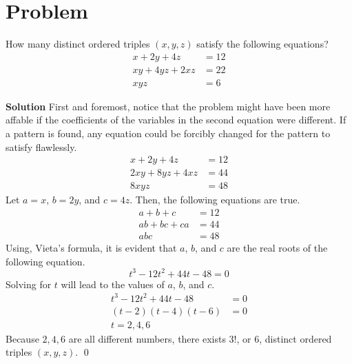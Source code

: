 \documentclass{article}
\newenvironment{solution}{\begin{trivlist}\item[]{\bf Solution}}{\qed \end{trivlist}}
\begin{document}
\section*{Problem}
How many distinct ordered triples $(x, y, z)$ satisfy the following equations?
\begin{align*}
    x + 2y + 4z &= 12 \\
    xy + 4yz + 2xz &= 22 \\
    xyz &= 6
\end{align*}
\begin{solution}
First and foremost, notice that the problem might have been more affable if the coefficients of the variables in the second equation were different. If a pattern is found, any equation could be forcibly changed for the pattern to satisfy flawlessly.
\begin{align*}
    x + 2y + 4z &= 12 \\
    2xy + 8yz + 4xz &= 44 \\
    8xyz &= 48
\end{align*}
Let $a = x$, $b = 2y$, and $c = 4z$. Then, the following equations are true.
\begin{align*}
    a + b + c &= 12 \\
    ab + bc + ca &= 44 \\
    abc &= 48
\end{align*}
Using, Vieta's formula, it is evident that $a$, $b$, and $c$ are the real roots of the following equation.
\[
t^3 - 12t^2 + 44t - 48 = 0
\]
Solving for $t$ will lead to the values of $a$, $b$, and $c$.
\begin{align*}
    t^3 - 12t^2 + 44t - 48 &= 0 \\
    (t - 2)(t - 4)(t - 6) &= 0 \\
    t = 2, 4, 6
\end{align*}
Because $2, 4, 6$ are all different numbers, there exists $3!$, or $\boxed{6}$, distinct ordered triples $(x, y, z)$.
\end{solution}
\end{document}
